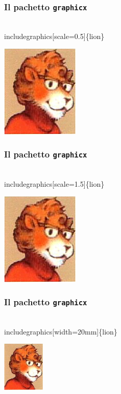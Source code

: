\documentclass[svgnames,%
	ucs,%
	pdftex]{guitbeamer}
\begin{document}
\begin{frame}
  \frametitle{Il pachetto \texttt{graphicx}}
	\begin{LaTeXcode}
		\\includegraphics\alert{[scale=0.5]}\{lion\}
	\end{LaTeXcode}
	\begin{center}
		\includegraphics[scale=0.5]{lion}
	\end{center}
\end{frame}
\begin{frame}
  \frametitle{Il pachetto \texttt{graphicx}}
	\begin{LaTeXcode}
		\\includegraphics\alert{[scale=1.5]}\{lion\}
	\end{LaTeXcode}
	\begin{center}
		\includegraphics[scale=1.5]{lion}
	\end{center}
\end{frame}
\begin{frame}
  \frametitle{Il pachetto \texttt{graphicx}}
	\begin{LaTeXcode}
		\\includegraphics\alert{[width=20mm]}\{lion\}
	\end{LaTeXcode}
	\begin{center}
		\includegraphics[width=20mm]{lion}
	\end{center}
\end{frame}
\end{document}
